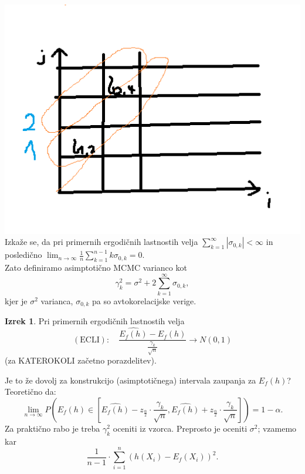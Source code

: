 \documentclass[a4paper, 12pt]{book}
\theoremstyle{definition}
\newtheorem{theorem}[counter]{Izrek}
\theoremstyle{remark}
\begin{document}
\includegraphics[scale=0.4]{sigma_3_5} \\
Izkaže se, da pri primernih ergodičnih lastnostih velja $\sum_{k=1}^{\infty} |\sigma_{0,k}| < \infty$
in posledično $\lim_{n \to \infty} \frac{1}{n} \sum_{k=1}^{n-1} k \sigma_{0,k} = 0$. \\
Zato definiramo asimptotično MCMC varianco kot
\begin{equation*}
  \gamma_k^2 = \sigma^2 + 2 \sum_{k=1}^{\infty} \sigma_{0,k},
\end{equation*}
kjer je $\sigma^2$  varianca, $\sigma_{0,k}$ pa so  avtokorelacijske verige.
\begin{theorem}
  Pri primernih ergodičnih lastnostih velja
  \begin{equation*}
    (\text{ECLI}): \quad \frac{\widehat{E_f(h)} - E_f(h)}{\frac{\gamma_k}{\sqrt{n}}} \longrightarrow N(0,1)
  \end{equation*}
  (za KATEROKOLI začetno porazdelitev).
\end{theorem}
Je to že dovolj za konstrukcijo (asimptotičnega) intervala zaupanja za $E_f(h)$?
Teoretično da:
\begin{equation*}
  \lim_{n \to \infty} P\left(E_f(h) \in \left[\widehat{E_f(h)} - z_{\frac{\alpha}{2}} \cdot \frac{\gamma_k}{\sqrt{n}},
    \widehat{E_f(h)} + z_{\frac{\alpha}{2}} \cdot \frac{\gamma_k}{\sqrt{n}}\right]\right) = 1 - \alpha.
\end{equation*}
Za praktično rabo je treba $\gamma_k^2$ oceniti iz vzorca.
Preprosto je oceniti $\sigma^2$; vzamemo kar
\begin{equation*}
  \frac{1}{n-1} \cdot \sum_{i=1}^{n} \left(h(X_i) - E_f(X_i)\right)^2.
\end{equation*}
\end{document}
